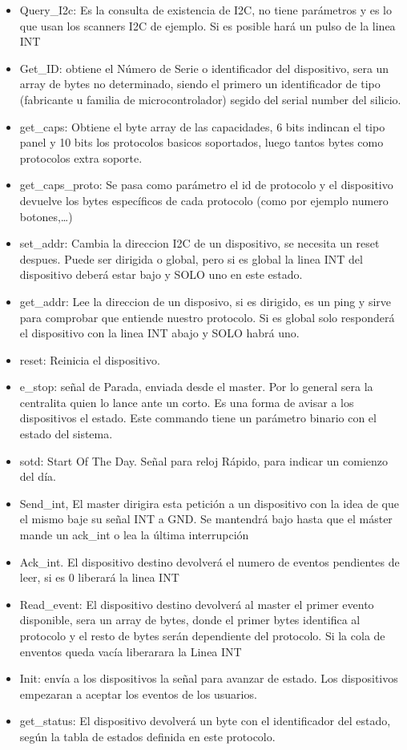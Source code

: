 \begin{itemize}
    \item{} Query\_I2c: Es la consulta de existencia de I2C, no tiene parámetros y es lo que usan los scanners I2C
          de ejemplo. Si es posible hará un pulso de la linea INT
    \item{} Get\_ID: obtiene el Número de Serie o identificador del dispositivo, sera un array de bytes
          no determinado, siendo el primero un identificador de tipo (fabricante u familia de microcontrolador)
          segido del serial number del silicio.
    \item{} get\_caps: Obtiene el byte array de las capacidades, 6 bits indincan el tipo panel y 10 bits los
          protocolos basicos soportados, luego tantos bytes como protocolos extra soporte.
    \item{} get\_caps\_proto: Se pasa como parámetro el id de protocolo y el dispositivo devuelve los bytes
          específicos de cada protocolo (como por ejemplo numero botones,…)
    \item{} set\_addr: Cambia la direccion I2C de un dispositivo, se necesita un reset despues. Puede ser dirigida
          o global, pero si es global la linea INT del dispositivo deberá estar bajo y SOLO uno en este estado.
    \item{} get\_addr: Lee la direccion de un disposivo, si es dirigido, es un ping y sirve para comprobar
          que entiende nuestro protocolo. Si es global solo responderá el dispositivo con la linea INT abajo y SOLO
          habrá uno.
    \item{} reset: Reinicia el dispositivo.
    \item{} e\_stop: señal de Parada, enviada desde el master. Por lo general sera la centralita quien lo lance
          ante un corto. Es una forma de avisar a los dispositivos el estado. Este commando tiene un parámetro binario
          con el estado del sistema.
    \item{} sotd: Start Of The Day. Señal para reloj Rápido, para indicar un comienzo del día.
    \item{} Send\_int, El master dirigira esta petición a un dispositivo con la idea de que el mismo baje su señal
          INT a GND. Se mantendrá bajo hasta que el máster mande un ack\_int o lea la última interrupción
    \item{} Ack\_int. El dispositivo destino devolverá el numero de eventos pendientes de leer, si es 0 liberará
          la linea INT
    \item{} Read\_event: El dispositivo destino devolverá al master el primer evento disponible, sera un array de
          bytes, donde el primer bytes identifica al protocolo y el resto de bytes serán dependiente del protocolo.
          Si la cola de enventos queda vacía liberarara la Linea INT
    \item{} Init: envía a los dispositivos la señal para avanzar de estado. Los dispositivos empezaran a aceptar
          los eventos de los usuarios.
    \item{} get\_status: El dispositivo devolverá un byte con el identificador del estado, según la tabla de
          estados definida en este protocolo.

\end{itemize}